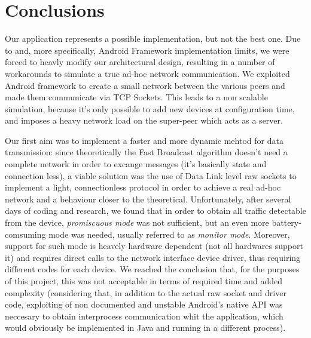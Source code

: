 \section{Conclusions}
	Our application represents a possible implementation, but not the best one. Due to \direct and, more specifically, Android \direct Framework implementation limits, we were forced to heavly modify our architectural design, resulting in a number of workarounds to simulate a true ad-hoc network communication. We exploited Android \direct framework to create a small network between the various peers and made them communicate via TCP Sockets. This leads to a non scalable simulation, because it's only possible to add new devices at configuration time, and imposes a heavy network load on the super-peer which acts as a server.
	
	Our first aim was to implement a faster and more dynamic mehtod for data transmission: since theoretically the Fast Broadcast algorithm doesn't need a complete network in order to excange messages (it's basically state and connection less), a viable solution was the use of Data Link level raw sockets to implement a light, connectionless protocol in order to achieve a real ad-hoc network and a behaviour closer to the theoretical. Unfortunately, after several days of coding and research, we found that in order to obtain all traffic detectable from the device, \textit{promiscuous mode} was not sufficient, but an even more battery-comsuming mode was needed, usually referred to as \textit{monitor mode}. Moreover, support for such mode is heavely hardware dependent (not all hardwares support it) and requires direct calls to the network interface device driver, thus requiring different codes for each device. We reached the conclusion that, for the purposes of this project, this was not acceptable in terms of required time and added complexity (considering that, in addition to the actual raw socket and driver code, exploiting of non documented and unstable Android's native API was neccesary to obtain interprocess communication whit the application, which would obviously be implemented in Java and running in a different process).
